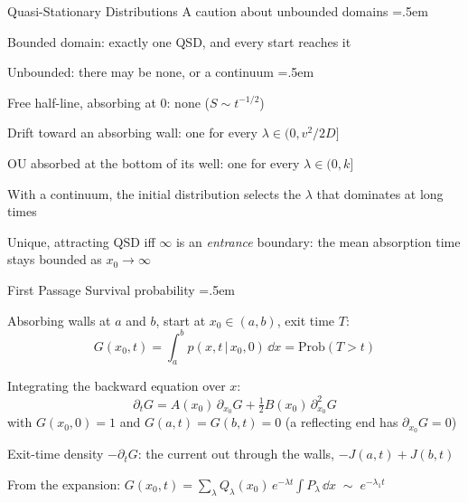 \documentclass[xcolor={dvipsnames},t]{beamer}
\let\olditemize=\itemize
\let\endolditemize=\enditemize
\renewenvironment{itemize}{\olditemize \itemsep=.5em }{\endolditemize}
\newcommand{\gv}{\,|\,}
\begin{document}
\begin{frame}{Quasi-Stationary Distributions}
    \alert{A caution about unbounded domains}
    \begin{itemize}
        \item<2-> Bounded domain: exactly one QSD, and every start reaches it
        \item<3-> Unbounded: there may be none, or a continuum
        \begin{itemize}
            \item<4-> Free half-line, absorbing at $0$: none ($S\sim t^{-1/2}$)
            \item<5-> Drift toward an absorbing wall: one for every $\lambda\in(0,v^2/2D]$
            \item<6-> OU absorbed at the bottom of its well: one for every $\lambda\in(0,k]$
        \end{itemize}
        \item<7-> With a continuum, the initial distribution selects the $\lambda$ that dominates at long times
        \item<8-> Unique, attracting QSD iff $\infty$ is an \textit{entrance} boundary: the mean absorption time stays bounded as $x_0\to\infty$
    \end{itemize}
\end{frame}

\begin{frame}{First Passage}
    \alert{Survival probability}
    \begin{itemize}
        \item<2-> Absorbing walls at $a$ and $b$, start at $x_0\in(a,b)$, exit time $T$:
        \[ G(x_0,t) = \int_a^b p(x,t\gv x_0,0)\,\dd x = \text{Prob}(T>t) \]
        \vspace{-1.5em}
        \item<3-> Integrating the backward equation over $x$:
        \[ \partial_tG = A(x_0)\,\partial_{x_0}G + \tfrac12B(x_0)\,\partial_{x_0}^2G \]
        with $G(x_0,0)=1$ and $G(a,t)=G(b,t)=0$ (a reflecting end has $\partial_{x_0}G=0$)
        \item<4-> Exit-time density $-\partial_tG$: the current out through the walls, $-J(a,t)+J(b,t)$
        \item<5-> From the expansion: $G(x_0,t)=\sum_\lambda Q_\lambda(x_0)\,e^{-\lambda t}\int P_\lambda\,\dd x\;\sim\;e^{-\lambda_1t}$
    \end{itemize}
\end{frame}
\end{document}
